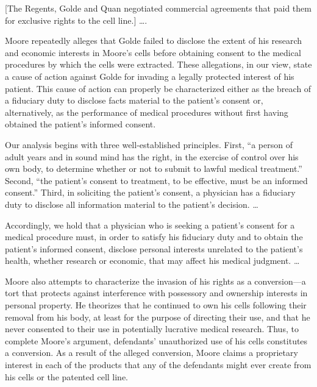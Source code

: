[The Regents, Golde and Quan negotiated commercial agreements that paid them for
exclusive rights to the cell line.] {\dots}.



Moore repeatedly alleges that Golde failed to disclose the extent of his
research and economic interests in Moore's cells before obtaining consent to
the medical procedures by which the cells were extracted. These allegations, in
our view, state a cause of action against Golde for invading a legally
protected interest of his patient. This cause of action can properly be
characterized either as the breach of a fiduciary duty to disclose facts
material to the patient's consent or, alternatively, as the performance of
medical procedures without first having obtained the patient's informed
consent.

Our analysis begins with three well-established principles. First, ``a person of
adult years and in sound mind has the right, in the exercise of control over
his own body, to determine whether or not to submit to lawful medical
treatment.'' Second, ``the patient's consent to treatment, to be effective,
must be an informed consent.'' Third, in soliciting the patient's consent, a
physician has a fiduciary duty to disclose all information material to the
patient's decision. {\dots}

Accordingly, we hold that a physician who is seeking a patient's consent for a
medical procedure must, in order to satisfy his fiduciary duty and to obtain
the patient's informed consent, disclose personal interests unrelated to the
patient's health, whether research or economic, that may affect his medical
judgment. {\dots} 


Moore also attempts to characterize the invasion of his rights as a
conversion---a tort that protects against interference with possessory and
ownership
interests in personal property. He theorizes that he continued to own his cells
following their removal from his body, at least for the purpose of directing
their use, and that he never consented to their use in potentially lucrative
medical research. Thus, to complete Moore's argument, defendants' unauthorized
use of his cells constitutes a conversion. As a result of the alleged
conversion, Moore claims a proprietary interest in each of the products that
any of the defendants might ever create from his cells or the patented cell
line.

